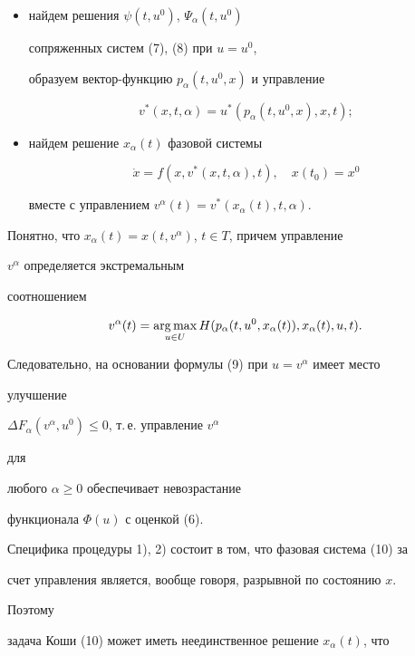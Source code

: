 \begin{itemize} 


\item[1)] найдем решения $\psi(t,u^0)$, $\Psi_\alpha(t,u^0)$


сопряженных систем (7), (8) при $u=u^0$, 


образуем вектор-функцию $p_\alpha(t,u^0,x)$ и управление 


$$ 


v^*(x,t,\alpha)=u^*(p_\alpha(t,u^0,x),x,t); 


$$ 


\item[2)] найдем решение $x_\alpha(t)$ фазовой системы 


\begin{equation} 


\Dot x=f(x,v^*(x,t,\alpha),t),\quad x(t_0)=x^0 


\end{equation} 


вместе с управлением $v^\alpha(t)=v^*(x_\alpha(t),t,\alpha)$. 


\end{itemize} 


Понятно, что $x_\alpha(t)=x(t,v^\alpha)$, $t\in T$, причем управление 


$v^\alpha$ определяется экстремальным 


соотношением 


$$ 


v^\alpha(t)=\argmax_{u\in U} 


H(p_\alpha(t,u^0,x_\alpha(t)),x_\alpha(t),u,t). 


$$ 


Следовательно, на основании формулы (9) при $u=v^\alpha$ имеет место 


улучшение 


$\Delta F_\alpha(v^\alpha,u^0)\le 0$, т.\,е.{} управление $v^\alpha$ 


для 


любого $\alpha\ge 0$ обеспечивает невозрастание 


функционала $\Phi(u)$ с оценкой (6). 


 


Специфика процедуры 1), 2) состоит в том, что фазовая система (10) за 


счет управления является, вообще говоря, разрывной по состоянию $x$. 


Поэтому 


задача Коши (10) может иметь неединственное решение $x_\alpha(t)$, что 


